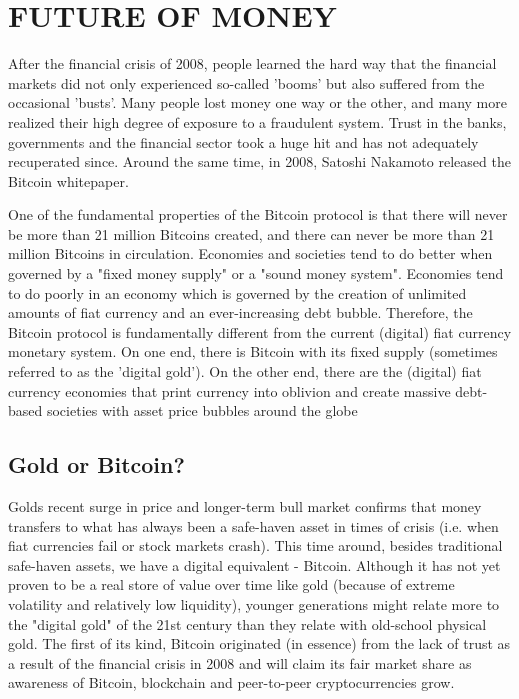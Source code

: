 \chapter{FUTURE OF MONEY}
\label{ch:Futureofmoney}

After the financial crisis of 2008, people learned the hard way that the financial markets did not only experienced so-called 'booms' but also suffered from the occasional 'busts'. Many people lost money one way or the other, and many more realized their high degree of exposure to a fraudulent system. Trust in the banks, governments and the financial sector took a huge hit and has not adequately recuperated since. 
Around the same time, in 2008, Satoshi Nakamoto released the Bitcoin whitepaper. \medskip

    \begin{tcolorbox}
    [enhanced,
    title=Satoshi Nakamoto,
    frame style=
    {left color=orange!85!black,right color=yellow!95!black}]
    
       One of the fundamental properties of the Bitcoin protocol is that there will never be more than 21 million Bitcoins created, and there can never be more than 21 million Bitcoins in circulation. Economies and societies tend to do better when governed by a "fixed money supply" or a "sound money system". Economies tend to do poorly in an economy which is governed by the creation of unlimited amounts of fiat currency and an ever-increasing debt bubble. Therefore, the Bitcoin protocol is fundamentally different from the current (digital) fiat currency monetary system. On one end, there is Bitcoin with its fixed supply (sometimes referred to as the 'digital gold'). On the other end, there are the (digital) fiat currency economies that print currency into oblivion and create massive debt-based societies with asset price bubbles around the globe 
\end{tcolorbox}
\medskip 


\section{Gold or Bitcoin?}
Golds recent surge in price and longer-term bull market confirms that money transfers to what has always been a safe-haven asset in times of crisis (i.e. when fiat currencies fail or stock markets crash). This time around, besides traditional safe-haven assets, we have a digital equivalent - Bitcoin. Although it has not yet proven to be a real store of value over time like gold (because of extreme volatility and relatively low liquidity), younger generations might relate more to the "digital gold" of the 21st century than they relate with old-school physical gold. The first of its kind, Bitcoin originated (in essence) from the lack of trust as a result of the financial crisis in 2008 and will claim its fair market share as awareness of Bitcoin, blockchain and peer-to-peer cryptocurrencies grow.\medskip

